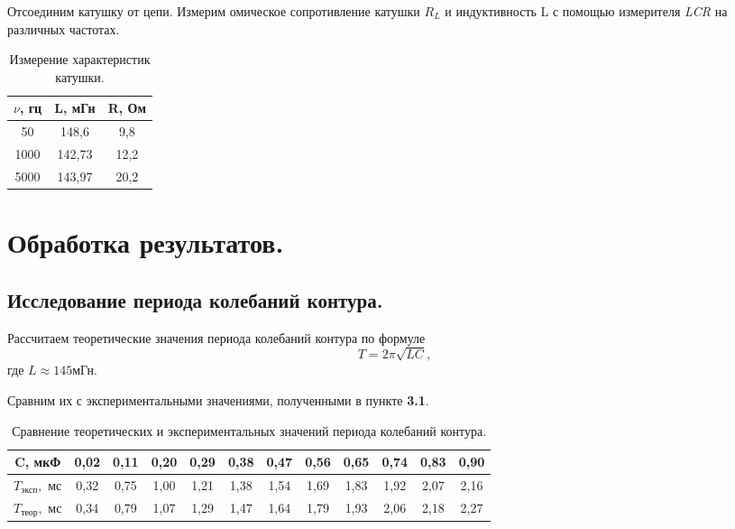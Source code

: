 \documentclass[a4paper, 12pt, twoside]{article}
\begin{document}
Отсоединим катушку от цепи. Измерим омическое сопротивление катушки $R_{L}$ и индуктивность L с помощью измерителя \textit{LCR} на различных частотах.
\begin{table}[H]
	\centering
	\caption{Измерение характеристик катушки.}
	\label{table4}
	\begin{tabular}{|c|c|c|}
		\hline
		$\nu$, гц & L, мГн & R, Ом \\ \hline
		50    & 148,6  & 9,8   \\ \hline
		1000  & 142,73 & 12,2  \\ \hline
		5000  & 143,97 & 20,2  \\ \hline
	\end{tabular}
\end{table}

\section{Обработка результатов.}

\subsection{Исследование периода колебаний контура.}

Рассчитаем теоретические значения периода колебаний контура по формуле $$T=2\pi\sqrt{LC},$$ где $L\approx 145$мГн.

Сравним их с экспериментальными значениями, полученными в пункте \textbf{3.1}.

\begin{table}[H]
	\centering
	\caption{Сравнение теоретических и экспериментальных значений периода колебаний контура.}
	\label{table5}
	\begin{tabular}{|c|c|c|c|c|c|c|c|c|c|c|c|}
		\hline
		C, мкФ    & 0,02 & 0,11 & 0,20 & 0,29 & 0,38 & 0,47 & 0,56 & 0,65 & 0,74 & 0,83 & 0,90 \\ \hline
		$T_{\text{эксп}},$ мс & 0,32 & 0,75 & 1,00 & 1,21 & 1,38 & 1,54 & 1,69 & 1,83 & 1,92 & 2,07 & 2,16 \\ \hline
		$T_{\text{теор}},$ мс & 0,34 & 0,79 & 1,07 & 1,29 & 1,47 & 1,64 & 1,79 & 1,93 & 2,06 & 2,18 & 2,27 \\ \hline
	\end{tabular}
\end{table}
\end{document}
